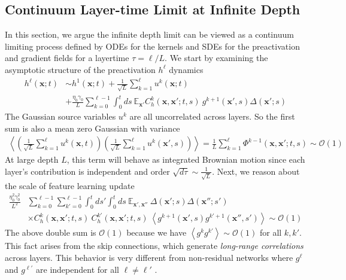 \documentclass{article} %
\def\x{\bm x}
\begin{document}
\subsection{Continuum Layer-time Limit at Infinite Depth}\label{app:continuum_limit}

In this section, we argue the infinite depth limit can be viewed as a continuum limiting process defined by ODEs for the kernels and SDEs for the preactivation and gradient fields for a layertime $\tau = \ell / L$. We start by examining the asymptotic structure of the preactivation $h^\ell$ dynamics 
\begin{align}
    h^{\ell}(\x;t) &\sim h^{1}(\x;t) + \frac{1}{\sqrt L} \sum_{k=1}^{\ell} u^{k}(\x;t) \nonumber
    \\
    &+ \frac{\eta_0 \gamma_0}{L} \sum_{k=0}^{\ell-1} \int_0^t ds \ \mathbb{E}_{\x'} C_h^k(\x,\x';t,s) \ g^{k+1}(\x', s) \Delta(\x';s) 
\end{align}
The Gaussian source variables $u^k$ are all uncorrelated across layers. So the first sum is also a mean zero Gaussian with variance
\begin{align}
    \left< \left(  \frac{1}{\sqrt L} \sum_{k=1}^{\ell} u^{k}(\x,t) \right) \left(  \frac{1}{\sqrt L} \sum_{k=1}^{\ell} u^{k}(\x',s) \right)  \right> = \frac{1}{L} \sum_{k=1}^\ell \Phi^{k-1}(\x,\x';t,s) \sim \mathcal{O}(1)
\end{align}
At large depth $L$, this term will behave as integrated Brownian motion since each layer's contribution is independent and order $\sqrt{d\tau} \sim \frac{1}{\sqrt L}$. Next, we reason about the scale of feature learning update
\begin{align}
    \frac{\eta_0^2 \gamma_0^2}{L^2} &\sum_{k=0}^{\ell-1} \sum_{k'=0}^{\ell-1} \int_0^t ds' \int_0^t ds \ \mathbb{E}_{\x', \x''} \ \Delta(\x';s) \Delta(\x'';s') \nonumber
    \\
    &\times C_h^{k}(\x,\x';t,s) \ C_h^{k'}(\x,\x';t, s)  \ \left< g^{k+1}(\x', s) g^{k'+1}(\x'',s')  \right> \sim \mathcal{O}(1)
\end{align}
The above double sum is $\mathcal{O}(1)$ because we have $\left< g^k g^{k'} \right> \sim \mathcal{O}(1)$ for all $k, k'$. This fact arises from the skip connections, which generate \textit{long-range correlations} across layers. This behavior is very different from non-residual networks where $g^{\ell}$ and $g^{\ell'}$ are independent for all $\ell \neq \ell'$ \citep{bordelon2022self}.
\end{document}

